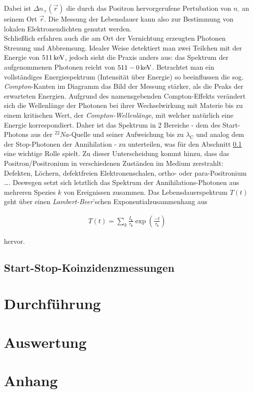 \documentclass[numbers=noenddot,a4paper,notitlepage,twoside]{scrartcl}
\newcommand{\ix}[1]{_\text{#1}}
\newcommand{\tilt}[1]{\textit{#1}}
\begin{document}
			Dabei ist $\Delta n\ix{+}\left(\vec{r}\right)$ die durch das Positron hervorgerufene Pertubation von $n\ix{-}$ an seinem Ort $\vec{r}$. Die Messung der Lebensdauer kann also zur Bestimmung von lokalen Elektronendichten genutzt werden.\\
			Schließlich erfahren auch die am Ort der Vernichtung erzeugten Photonen Streuung und Abbremsung. Idealer Weise detektiert man zwei Teilchen mit der Energie von $\unit[511]{keV}$, jedoch sieht die Praxis anders aus: das Spektrum der aufgenommenen Photonen reicht von \mbox{$\unit[511-0]{keV}$}. Betrachtet man ein vollständiges Energiespektrum (Intensität über Energie) so beeinflussen die sog. \tilt{Compton}-Kanten im Diagramm das Bild der Messung stärker, als die Peaks der erwarteten Energien. Aufgrund des namensgebenden Compton-Effekts verändert sich die Wellenlänge der Photonen bei ihrer Wechselwirkung mit Materie bis zu einem kritischen Wert, der \tilt{Compton-Wellenlänge}, mit welcher natürlich eine Energie korrespondiert. Daher ist das Spektrum in 2 Bereiche - dem des Start-Photons aus der $^{22}Na$-Quelle und seiner Aufweichung bis zu $\lambda\ix{C}$ und analog dem der Stop-Photonen der Annihilation - zu unterteilen, was für den Abschnitt \ref{subsec:koinz} eine wichtige Rolle spielt. Zu dieser Unterscheidung kommt hinzu, dass das Positron/Positronium in verschiedenen Zuständen im Medium zerstrahlt: Defekten, Löchern, defektfreien Elektronenschalen, ortho- oder para-Positronium \dots . Deswegen setzt sich letztlich das Spektrum der Annihilations-Photonen aus mehreren Spezies $k$ von Ereignissen zusammen. Das Lebensdauerspektrum $T\left(t\right)$ geht über einen \tilt{Lambert-Beer}'schen Exponentialzusammenhang aus

			\begin{align}
				T\left(t\right)=\sum_{k}\frac{I\ix{k}}{\tau\ix{k}}\exp\left(\frac{-t}{\tau\ix{k}}\right)
			\end{align}

			hervor. 

		\subsection{Start-Stop-Koinzidenzmessungen}\label{subsec:koinz}

	\newpage
	\section{Durchführung}
	
	\newpage
	\section{Auswertung}
	
	\newpage
	\section{Anhang}

		
		
\end{document}

